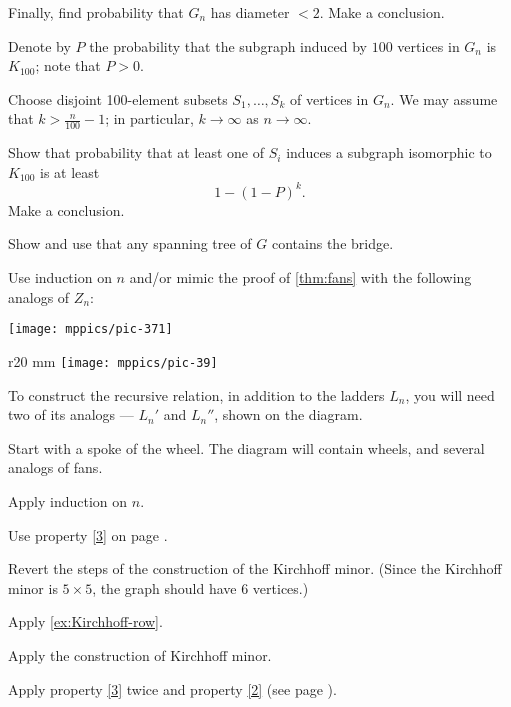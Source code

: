 Finally, find probability that $G_n$ has diameter $<2$.
Make a conclusion.

Denote by $P$ the probability that the subgraph induced by $100$ vertices in $G_n$ is $K_{100}$;
note that $P>0$.

Choose disjoint 100-element subsets $S_1,\dots,S_k$ of vertices in $G_n$.
We may assume that $k>\tfrac n{100}-1$; in particular, $k\to \infty$ as $n\to \infty$.

Show that probability that at least one of $S_i$ induces a subgraph isomorphic to $K_{100}$ is at least 
\[1-(1-P)^k.\]
Make a conclusion.

\setcounter{eqtn}{0}

Show and use that any spanning tree of $G$ contains the bridge.

Use induction on $n$ and/or mimic the proof of \ref{thm:fans} with the following analogs of $Z_n$:

\begin{Figure}
\centering
\texttt{[image: mppics/pic-371]}
\end{Figure}

\begin{wrapfigure}{r}{20 mm}
\vskip-4mm
\centering
\texttt{[image: mppics/pic-39]}
\end{wrapfigure}

To construct the recursive relation, in addition to the ladders $L_n$, you will need two of its analogs --- $L_n'$ and $L_n''$, shown on the diagram.

 Start with a spoke of the wheel.
The diagram will contain wheels, and several analogs of fans.

\setcounter{eqtn}{0}

Apply induction on $n$.

Use property \ref{3} on page \pageref{3}.

Revert the steps of the construction of the Kirchhoff minor.
(Since the Kirchhoff minor is $5{\times}5$, 
the graph should have 6 vertices.)

Apply \ref{ex:Kirchhoff-row}.

Apply the construction of Kirchhoff minor.

Apply property \ref{3} twice and property \ref{2} (see page \pageref{3}).

